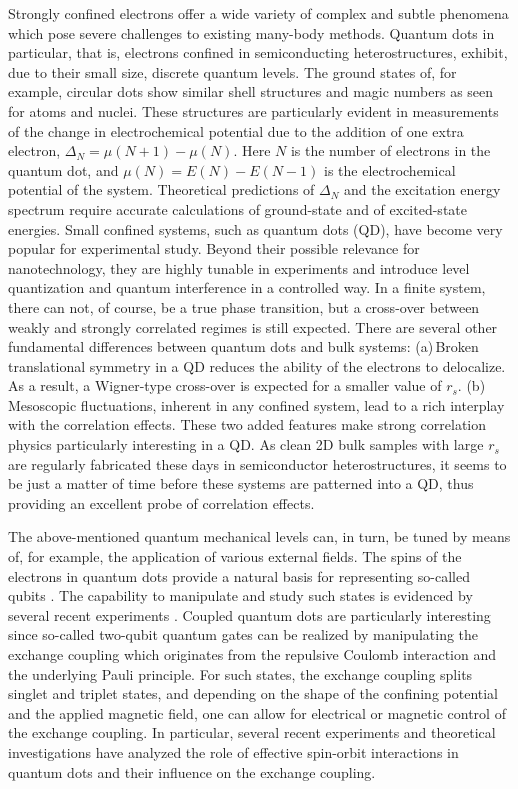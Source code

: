 \documentclass[twocolumn]{revtex4}
\begin{document}
Strongly confined electrons
offer a wide variety of complex and subtle phenomena which pose severe 
challenges to existing many-body methods.
Quantum dots in particular, that is, electrons confined in semiconducting heterostructures,
exhibit, due to their small size, discrete quantum levels. 
The ground states of, for example, circular dots
show similar shell structures and magic numbers 
as seen for atoms and nuclei. These structures are particularly evident in
measurements of the change in electrochemical potential due to the addition of
one extra electron, 
$\Delta_N=\mu(N+1)-\mu(N)$. Here $N$ is the number of electrons in the quantum dot, and
$\mu(N)=E(N)-E(N-1)$ is the electrochemical potential of the system.
Theoretical predictions of $\Delta_N$ and the excitation energy spectrum require
accurate calculations of ground-state and of excited-state energies.
Small confined systems, such as quantum dots (QD), have become very popular for experimental 
study. Beyond their possible relevance for nanotechnology, they are highly tunable 
in experiments and introduce level quantization and quantum interference in a controlled way. In a finite system, 
there can not, of course, be a true phase transition, but a cross-over between weakly and strongly correlated regimes is 
still expected. There are several other fundamental differences between quantum dots and bulk systems: (a)\,Broken translational 
symmetry in a QD reduces the ability of the electrons to delocalize. As a result, a Wigner-type cross-over 
is expected for a smaller value of $r_s$. (b)\,Mesoscopic fluctuations, inherent in any confined system, 
lead to a rich interplay with the correlation effects. These two added features make strong correlation physics particularly 
interesting in a QD. As clean 2D bulk samples with large $r_s$ are regularly fabricated these days in semiconductor 
heterostructures, it seems to be just a matter of time before these systems are patterned into a QD, 
thus providing an excellent probe of correlation effects.



The above-mentioned quantum mechanical levels can, in turn, be tuned by means
of, for example, the application of various external fields.  
The spins of the electrons in quantum dots
provide a natural basis for representing so-called qubits \cite{divincenzo1996}. The capability to manipulate
and study such states is evidenced by several recent experiments \cite{exp1,exp2}.
Coupled quantum dots are particularly interesting since so-called  
two-qubit quantum gates can be realized by manipulating the 
exchange coupling which originates from the repulsive Coulomb interaction 
and the underlying Pauli principle.  For such states, the exchange coupling splits singlet and triplet states, 
and depending on the shape of the confining potential and the applied magnetic field, one can allow
for electrical or magnetic control of the exchange coupling. In particular, several recent experiments and 
theoretical investigations have analyzed the role of effective spin-orbit interactions 
in quantum dots \cite{exp5,exp6,pederiva2010,spinorbit} and their influence on the exchange coupling.
\end{document}
